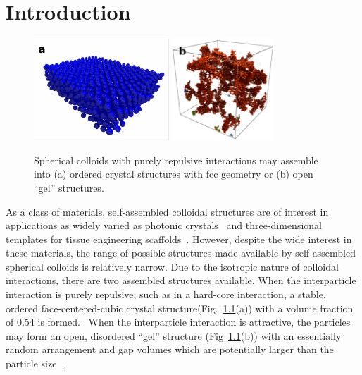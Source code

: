 \chapter{Introduction}

\begin{figure}
\begin{center}
\includegraphics[height=1.5in]{figures/literature-review/sphere-crystal.png}
\includegraphics[height=1.5in]{figures/literature-review/sphere-gel.png}
\end{center}
\caption{Spherical colloids with purely repulsive interactions may assemble into (a) ordered 
crystal structures with fcc geometry or (b) open ``gel'' structures.}

\label{fig:isotropic-structs}

\end{figure}

As a class of materials, self-assembled colloidal structures are of interest in applications as widely varied
as photonic crystals~\cite{vos-photonic, yang-photonic} and three-dimensional templates for tissue 
engineering scaffolds~\cite{zhang-tissue}. However, despite the wide interest in these materials, the range of possible 
structures made available by self-assembled spherical colloids is relatively narrow.  Due to the isotropic nature
of colloidal interactions, there are two assembled structures available.
When the interparticle interaction is purely 
repulsive, such as in a hard-core interaction,  a stable, ordered face-centered-cubic crystal
structure(Fig.~\ref{fig:isotropic-structs}(a)) with a volume fraction of 0.54 is formed.~\cite{ise-crystal, wong-crystal}
When the interparticle interaction is attractive, the particles may form an open, disordered ``gel'' 
structure (Fig~\ref{fig:isotropic-structs}(b)) 
with an essentially random arrangement and gap volumes which are potentially larger than the 
particle size~\cite{warren-gel}.

